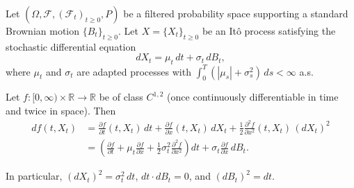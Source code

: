\begin{theorem} \label{theorem:itos_formula_for_a_function_of_an_ito_process}
Let $(\Omega, \mathcal{F}, (\mathcal{F}_t)_{t \geq 0}, P)$ be a filtered probability space supporting a standard Brownian motion $\{B_t\}_{t \geq 0}$. Let $X = \{X_t\}_{t \geq 0}$ be an Itô process satisfying the stochastic differential equation
$$dX_t = \mu_t \, dt + \sigma_t \, dB_t,$$
where $\mu_t$ and $\sigma_t$ are adapted processes with $\int_0^T (|\mu_s| + \sigma_s^2) \, ds < \infty$ a.s.

Let $f: [0, \infty) \times \mathbb{R} \to \mathbb{R}$ be of class $C^{1,2}$ (once continuously differentiable in time and twice in space). Then
$$\begin{aligned}
df(t, X_t) &= \frac{\partial f}{\partial t}(t, X_t) \, dt + \frac{\partial f}{\partial x}(t, X_t) \, dX_t + \frac{1}{2} \frac{\partial^2 f}{\partial x^2}(t, X_t) \, (dX_t)^2 \\
&= \left(\frac{\partial f}{\partial t} + \mu_t \frac{\partial f}{\partial x} + \frac{1}{2}\sigma_t^2 \frac{\partial^2 f}{\partial x^2}\right) dt + \sigma_t \frac{\partial f}{\partial x} \, dB_t.
\end{aligned}$$

In particular, $(dX_t)^2 = \sigma_t^2 \, dt$, $dt \cdot dB_t = 0$, and $(dB_t)^2 = dt$.
\end{theorem}
